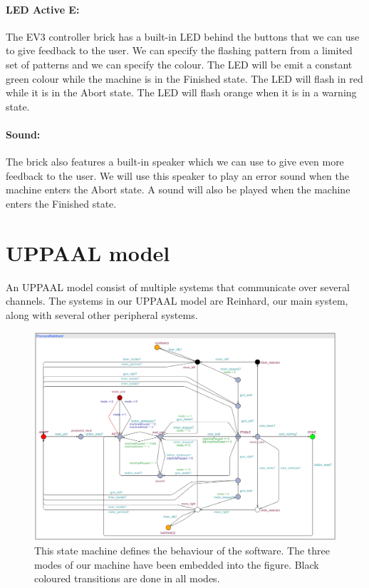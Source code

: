 \documentclass[a4paper,oneside,11pt]{article}
\begin{document}
\paragraph{LED Active E:} The EV3 controller brick has a built-in LED behind the buttons that we can use to give feedback to the user. We can specify the flashing pattern from a limited set of patterns and we can specify the colour. The LED will be emit a constant green colour while the machine is in the Finished state. The LED will flash in red while it is in the Abort state. The LED will flash orange when it is in a warning state.
\paragraph{Sound:} The brick also features a built-in speaker which we can use to give even more feedback to the user. We will use this speaker to play an error sound when the machine enters the Abort state. A sound will also be played when the machine enters the Finished state.

\section{UPPAAL model}
An UPPAAL model consist of multiple systems that communicate over several channels. The systems in our UPPAAL model are Reinhard, our main system, along with several other peripheral systems.

\begin{figure}[H]
	\centering
	\includegraphics[width=150mm]{mainprocess}
	\caption{This state machine defines the behaviour of the software. The three modes of our machine have been embedded into the figure. Black coloured transitions are done in all modes.}
\end{figure}
\end{document}
